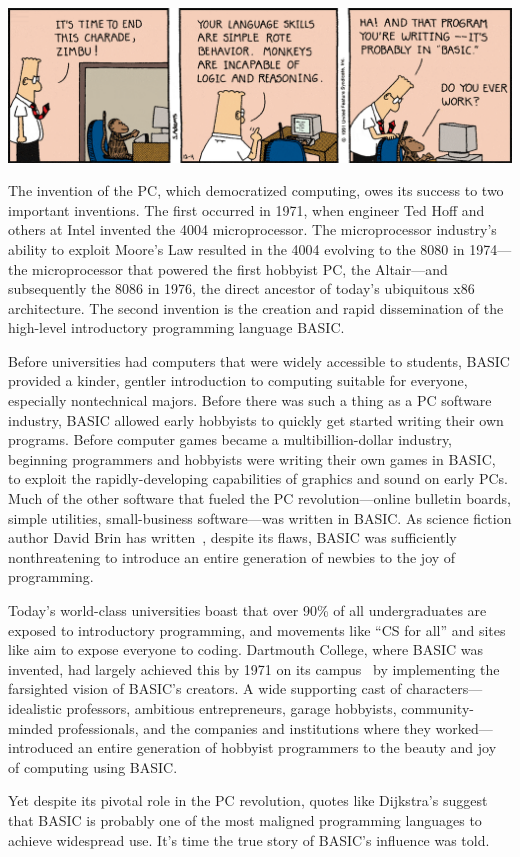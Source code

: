 

\noindent\includegraphics[width=\textwidth]{figs/dilbert-1991-12-04.png}

The invention of the PC, which democratized computing, owes its success
to two important inventions.  
The first occurred in 1971, when engineer Ted Hoff and others
at Intel invented the 4004 microprocessor.
The microprocessor industry's ability to exploit Moore's Law resulted in
the 4004 evolving to the 8080 in 1974---the microprocessor that powered
the first hobbyist PC, the Altair---and subsequently the 8086 in 1976,
the direct  ancestor of today's ubiquitous x86
architecture.
The second invention is the creation and rapid dissemination of the
high-level introductory programming language BASIC.

Before universities had computers that were widely accessible to students, BASIC
provided a kinder, gentler introduction to computing suitable for
everyone, especially nontechnical majors.
Before there was such a thing as a PC software industry, 
BASIC allowed early hobbyists to quickly get started writing their own
programs.
Before computer games became a multibillion-dollar industry, beginning
programmers and hobbyists were writing their own games in BASIC, to
exploit the rapidly-developing capabilities of graphics and sound on
early PCs. 
Much of the other software that fueled the PC revolution---online
bulletin boards, simple utilities, small-business software---was written
in BASIC. 
As science fiction author David Brin has written~\cite{why_johnny_cant_code},
despite its flaws, BASIC
was sufficiently nonthreatening to introduce an entire generation of
newbies to the joy of programming.

Today's world-class universities boast that over 90\% of all
undergraduates are exposed to introductory programming, and movements
like ``CS for all'' and sites like  aim to expose everyone
to coding.
Dartmouth College, where BASIC was invented, had largely
achieved this by 1971 on its campus~\cite{man_and_computer} by implementing the
farsighted vision of BASIC's creators.
A wide supporting cast of characters---idealistic professors,
ambitious entrepreneurs, garage hobbyists, community-minded
professionals, and the companies and institutions where they
worked---introduced  an entire generation
of hobbyist programmers to the beauty and joy of computing using BASIC.

Yet  despite its pivotal role in the PC
revolution,  quotes like Dijkstra's suggest that
BASIC is probably one of the most maligned programming
languages to achieve widespread use.  It's time the true story of
BASIC's influence was told.
